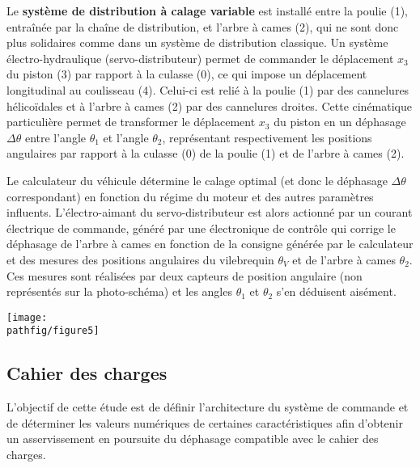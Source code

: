 \documentclass[10pt,fleqn]{article} %
\begin{document}
\begin{multicols}{2}
Le \textbf{système de distribution à calage variable} est installé entre la poulie (1), entraînée par la chaîne de distribution, et l'arbre à cames (2), qui ne sont donc plus solidaires comme dans un système de distribution classique. Un système électro-hydraulique (servo-distributeur) permet de commander le déplacement $x_{3}$ du piston (3) par rapport à la culasse (0), ce qui impose un déplacement longitudinal au coulisseau (4). Celui-ci est relié à la poulie (1) par des cannelures hélicoïdales et à l'arbre à cames (2) par des cannelures droites. Cette cinématique particulière permet de transformer le déplacement $x_{3}$ du piston en un déphasage $\Delta \theta$ entre l'angle $\theta_{1}$ et l'angle $\theta_{2}$, représentant respectivement les positions angulaires par rapport à la culasse (0) de la poulie (1) et de l'arbre à cames (2).



Le calculateur du véhicule détermine le calage optimal (et donc le déphasage $\Delta \theta $ correspondant) en fonction du régime du moteur et des autres paramètres influents. L'électro-aimant du servo-distributeur est alors actionné par un courant électrique de commande, généré par une électronique de contrôle qui corrige le déphasage de l'arbre à cames en fonction de la consigne générée par le calculateur et des mesures des positions angulaires du vilebrequin $\theta_{V}$ et de l'arbre à cames $\theta_{2}$. Ces mesures sont réalisées par deux capteurs de position angulaire (non représentés sur la photo-schéma) et les angles $\theta_{1}$ et $\theta_{2}$ s'en déduisent aisément.



\begin{center}
\texttt{[image: \\pathfig/figure5]}
\end{center}


\normalsize

\subsection*{Cahier des charges}

\begin{obj}
L'objectif de cette étude est de définir l'architecture du système de commande et de déterminer les valeurs numériques de certaines caractéristiques afin d'obtenir un asservissement en poursuite du déphasage compatible avec le cahier des charges.
\end{obj}



\end{multicols}
\end{document}
